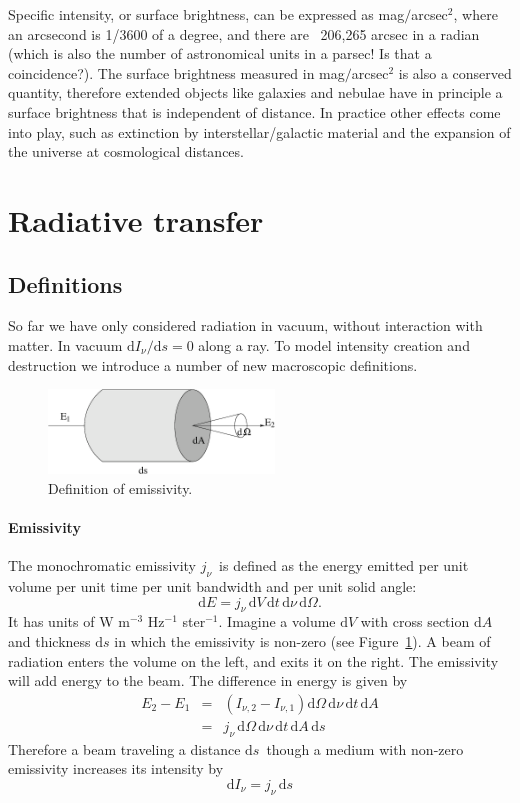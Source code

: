 \documentclass[12pt]{article}
\numberwithin{equation}{section}
\def\dd{\mathrm{d}}
\def\Inu{\ensuremath{I_{\nu}}}
\def\jnu{\ensuremath{j_{\nu}}}
\def\dO{\ensuremath{\dd \Omega}}
\def\ds{\ensuremath{\dd s}}
\def\dnu{\ensuremath{\dd \nu}}
\newcommand{\be}{\begin{equation}}
\newcommand{\ee}{\end{equation}}
\newcommand{\bea}{\begin{eqnarray}}
\newcommand{\eea}{\end{eqnarray}}
\newcommand{\dt}{\dd t}
\begin{document}
Specific intensity, or surface brightness, can be expressed as mag$/$arcsec$^2$, where an arcsecond is 1/3600 of a degree, and there are ~206,265 arcsec in a radian (which is also the number of astronomical units in a parsec! Is that a coincidence?). The surface brightness measured in mag$/$arcsec$^2$ is also a conserved quantity, therefore extended objects like galaxies and nebulae have in principle a surface brightness that is independent of distance. In practice other effects come into play, such as extinction by interstellar/galactic material and the expansion of the universe at cosmological distances.

\section{Radiative transfer}

\subsection{Definitions}

So far we have only considered radiation in vacuum, without interaction with matter. In vacuum $\dd \Inu / \ds =0 $ along a ray. To model intensity creation and destruction we introduce a number of new macroscopic definitions.

  \begin{figure}
   \includegraphics[width=6cm]{figs/emissivity_def}
    \caption{Definition of emissivity. \label{fig:emissivity_def}}
    \end{figure}

\paragraph{Emissivity} 
The monochromatic emissivity \jnu\ is defined as the energy emitted per unit volume per unit time per unit bandwidth and per unit solid angle:
\be
\dd E = \jnu \, \dd V \, \dd t \, \dnu \, \dO.
\ee
It has units of W m$^{-3}$ Hz$^{-1}$ ster$^{-1}$. Imagine a volume $\mathrm{d}V$ with cross section $\mathrm{d}A$ and thickness $\ds$ in which the emissivity is non-zero (see Figure~\ref{fig:emissivity_def}). A beam of radiation enters the volume on the left, and exits it on the right. The emissivity will add energy to the beam. The difference in energy is given by
\bea
E_2 - E_1 & = & \left( I_{\nu,2} - I_{\nu,1} \right)  \dO \, \dnu \, \dt \, \dd A \\
                 & = & \jnu \, \dO \, \dnu \, \dt \, \dd A \, \ds
\eea
Therefore a beam traveling a distance \ds\ though a medium with non-zero emissivity increases its intensity by
\be
\dd \Inu = \jnu \, \ds
\ee
\end{document}
